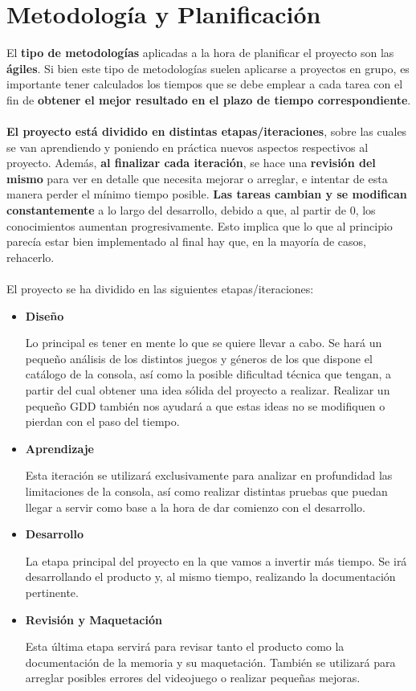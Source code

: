 \cleardoublepage

\chapter{Metodología y Planificación}
\label{planificacion}

El \textbf{tipo de metodologías} aplicadas a la hora de planificar el proyecto son las \textbf{ágiles}. Si bien este tipo de metodologías suelen aplicarse a proyectos en grupo, es importante tener calculados los tiempos que se debe emplear a cada tarea con el fin de \textbf{obtener el mejor resultado en el plazo de tiempo correspondiente}.
\\ \\
\textbf{El proyecto está dividido en distintas etapas/iteraciones}, sobre las cuales se van aprendiendo y poniendo en práctica nuevos aspectos respectivos al proyecto. Además, \textbf{al finalizar cada iteración}, se hace una \textbf{revisión del mismo} para ver en detalle que necesita mejorar o arreglar, e intentar de esta manera perder el mínimo tiempo posible. \textbf{Las tareas cambian y se modifican constantemente} a lo largo del desarrollo, debido a que, al partir de 0, los conocimientos aumentan progresivamente. Esto implica que lo que al principio parecía estar bien implementado al final hay que, en la mayoría de casos, rehacerlo.
\\ \\
El proyecto se ha dividido en las siguientes etapas/iteraciones:

\begin{itemize}
	\item \textbf{Diseño}
	
	Lo principal es tener en mente lo que se quiere llevar a cabo. Se hará un pequeño análisis de los distintos juegos y géneros de los que dispone el catálogo de la consola, así como la posible dificultad técnica que tengan, a partir del cual obtener una idea sólida del proyecto a realizar. Realizar un pequeño GDD también nos ayudará a que estas ideas no se modifiquen o pierdan con el paso del tiempo.

	\item \textbf{Aprendizaje}
	
	Esta iteración se utilizará exclusivamente para analizar en profundidad las limitaciones de la consola, así como realizar distintas pruebas que puedan llegar a servir como base a la hora de dar comienzo con el desarrollo.
	
	\item \textbf{Desarrollo}
	
	La etapa principal del proyecto en la que vamos a invertir más tiempo. Se irá desarrollando el producto y, al mismo tiempo, realizando la documentación pertinente.
	
	\item \textbf{Revisión y Maquetación}
	
	Esta última etapa servirá para revisar tanto el producto como la documentación de la memoria y su maquetación. También se utilizará para arreglar posibles errores del videojuego o realizar pequeñas mejoras.
	
\end{itemize}	

